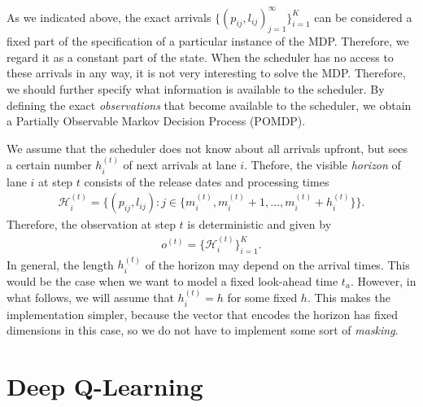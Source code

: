 \documentclass{article}
\theoremstyle{definition}
\theoremstyle{plain}
\begin{document}
As we indicated above, the exact arrivals $\{(p_{ij}, l_{ij})_{j=1}^{\infty}\}_{i=1}^{K}$ can
be considered a fixed part of the specification of a particular instance of the
MDP. Therefore, we regard it as a constant part of the state. When the scheduler
has no access to these arrivals in any way, it is not very interesting to solve
the MDP. Therefore, we should further specify what information is available to
the scheduler. By defining the exact \textit{observations} that become available
to the scheduler, we obtain a Partially Observable Markov Decision Process
(POMDP).

We assume that the scheduler does not know about all arrivals upfront, but sees
a certain number $h_{i}^{(t)}$ of next arrivals at lane $i$. Thefore, the
visible \textit{horizon} of lane $i$ at step $t$ consists of the release dates
and processing times
\begin{align}
  \mathcal{H}_{i}^{(t)} = \{ (p_{ij}, l_{ij}) : j \in \{ m_{i}^{(t)}, m_{i}^{(t)} + 1, \dots, m_{i}^{(t)} + h_{i}^{(t)} \} \} .
\end{align}
Therefore, the observation at step $t$ is deterministic and given by
\begin{align}
  o^{(t)} = \{ \mathcal{H}_{i}^{(t)} \}_{i=1}^{K} .
\end{align}
In general, the length $h_{i}^{(t)}$ of the horizon may depend on the arrival
times. This would be the case when we want to model a fixed look-ahead time
$t_{a}$. However, in what follows, we will assume that $h_{i}^{(t)} = h$ for
some fixed $h$. This makes the implementation simpler, because the vector that
encodes the horizon has fixed dimensions in this case, so we do not have to
implement some sort of \textit{masking}.



\section{Deep Q-Learning}
\end{document}
